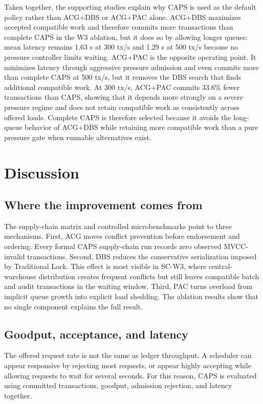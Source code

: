 \documentclass[fleqn,10pt,lineno]{wlpeerj}
\begin{document}
Taken together, the supporting studies explain why CAPS is used as the default policy rather than ACG+DBS or ACG+PAC alone. ACG+DBS maximizes accepted compatible work and therefore commits more transactions than complete CAPS in the W3 ablation, but it does so by allowing longer queues: mean latency remains 1.63 s at 300 tx/s and 1.29 s at 500 tx/s because no pressure controller limits waiting. ACG+PAC is the opposite operating point. It minimizes latency through aggressive pressure admission and even commits more than complete CAPS at 500 tx/s, but it removes the DBS search that finds additional compatible work. At 300 tx/s, ACG+PAC commits 33.6\% fewer transactions than CAPS, showing that it depends more strongly on a severe pressure regime and does not retain compatible work as consistently across offered loads. Complete CAPS is therefore selected because it avoids the long-queue behavior of ACG+DBS while retaining more compatible work than a pure pressure gate when runnable alternatives exist.

\section*{Discussion}

\subsection*{Where the improvement comes from}

The supply-chain matrix and controlled microbenchmarks point to three mechanisms. First, ACG moves conflict prevention before endorsement and ordering. Every formal CAPS supply-chain run records zero observed MVCC-invalid transactions. Second, DBS reduces the conservative serialization imposed by Traditional Lock. This effect is most visible in SC-W3, where central-warehouse distribution creates frequent conflicts but still leaves compatible batch and audit transactions in the waiting window. Third, PAC turns overload from implicit queue growth into explicit load shedding. The ablation results show that no single component explains the full result.

\subsection*{Goodput, acceptance, and latency}

The offered request rate is not the same as ledger throughput. A scheduler can appear responsive by rejecting most requests, or appear highly accepting while allowing requests to wait for several seconds. For this reason, CAPS is evaluated using committed transactions, goodput, admission rejection, and latency together.
\end{document}

